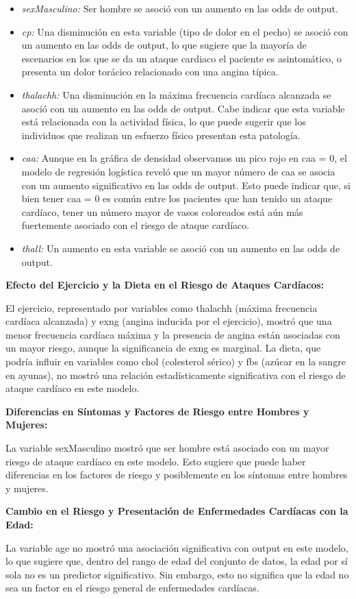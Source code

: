 \documentclass[
]{article}
\providecommand{\tightlist}{%
  \setlength{\itemsep}{0pt}\setlength{\parskip}{0pt}}
\begin{document}
\begin{itemize}
\tightlist
\item
  \emph{sexMasculino:} Ser hombre se asoció con un aumento en las odds
  de output.
\item
  \emph{cp:} Una disminución en esta variable (tipo de dolor en el
  pecho) se asoció con un aumento en las odds de output, lo que sugiere
  que la mayoría de escenarios en los que se da un ataque cardiaco el
  paciente es asintomático, o presenta un dolor torácico relacionado con
  una angina típica.
\item
  \emph{thalachh:} Una disminución en la máxima frecuencia cardíaca
  alcanzada se asoció con un aumento en las odds de output. Cabe indicar
  que esta variable está relacionada con la actividad física, lo que
  puede sugerir que los individuos que realizan un esfuerzo físico
  presentan esta patología.
\item
  \emph{caa:} Aunque en la gráfica de densidad observamos un pico rojo
  en caa = 0, el modelo de regresión logística reveló que un mayor
  número de caa se asocia con un aumento significativo en las odds de
  output. Esto puede indicar que, si bien tener caa = 0 es común entre
  los pacientes que han tenido un ataque cardíaco, tener un número mayor
  de vasos coloreados está aún más fuertemente asociado con el riesgo de
  ataque cardíaco.
\item
  \emph{thall:} Un aumento en esta variable se asoció con un aumento en
  las odds de output.
\end{itemize}

\textbf{Efecto del Ejercicio y la Dieta en el Riesgo de Ataques
Cardíacos:}

El ejercicio, representado por variables como thalachh (máxima
frecuencia cardíaca alcanzada) y exng (angina inducida por el
ejercicio), mostró que una menor frecuencia cardíaca máxima y la
presencia de angina están asociadas con un mayor riesgo, aunque la
significancia de exng es marginal. La dieta, que podría influir en
variables como chol (colesterol sérico) y fbs (azúcar en la sangre en
ayunas), no mostró una relación estadísticamente significativa con el
riesgo de ataque cardíaco en este modelo.

\textbf{Diferencias en Síntomas y Factores de Riesgo entre Hombres y
Mujeres:}

La variable sexMasculino mostró que ser hombre está asociado con un
mayor riesgo de ataque cardíaco en este modelo. Esto sugiere que puede
haber diferencias en los factores de riesgo y posiblemente en los
síntomas entre hombres y mujeres.

\textbf{Cambio en el Riesgo y Presentación de Enfermedades Cardíacas con
la Edad:}

La variable age no mostró una asociación significativa con output en
este modelo, lo que sugiere que, dentro del rango de edad del conjunto
de datos, la edad por sí sola no es un predictor significativo. Sin
embargo, esto no significa que la edad no sea un factor en el riesgo
general de enfermedades cardíacas.
\end{document}

